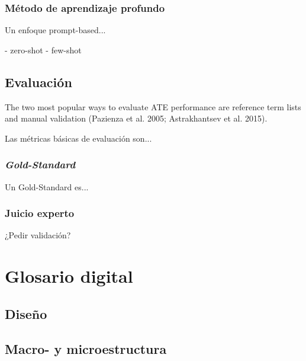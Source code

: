 \subsubsection{Método de aprendizaje profundo}

Un enfoque prompt-based...

- zero-shot
- few-shot

\subsection{Evaluación}

The two most popular ways to evaluate ATE performance are reference term lists
and manual validation (Pazienza et al. 2005; Astrakhantsev et al. 2015).

Las métricas básicas de evaluación son...

\subsubsection{\emph{Gold-Standard}}

Un Gold-Standard es...
\subsubsection{Juicio experto}

¿Pedir validación?

\section{Glosario digital}
\subsection{Diseño}
\subsection{Macro- y microestructura}

\clearpage


